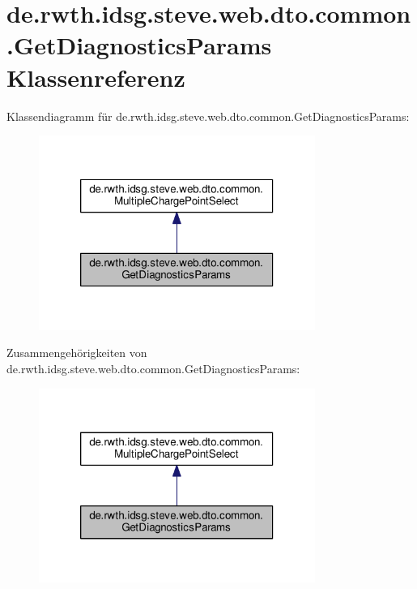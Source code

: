 \hypertarget{classde_1_1rwth_1_1idsg_1_1steve_1_1web_1_1dto_1_1common_1_1_get_diagnostics_params}{\section{de.\-rwth.\-idsg.\-steve.\-web.\-dto.\-common.\-Get\-Diagnostics\-Params Klassenreferenz}
\label{classde_1_1rwth_1_1idsg_1_1steve_1_1web_1_1dto_1_1common_1_1_get_diagnostics_params}
}


Klassendiagramm für de.\-rwth.\-idsg.\-steve.\-web.\-dto.\-common.\-Get\-Diagnostics\-Params\-:\nopagebreak
\begin{figure}[H]
\begin{center}
\leavevmode
\includegraphics[width=256pt]{classde_1_1rwth_1_1idsg_1_1steve_1_1web_1_1dto_1_1common_1_1_get_diagnostics_params__inherit__graph}
\end{center}
\end{figure}


Zusammengehörigkeiten von de.\-rwth.\-idsg.\-steve.\-web.\-dto.\-common.\-Get\-Diagnostics\-Params\-:\nopagebreak
\begin{figure}[H]
\begin{center}
\leavevmode
\includegraphics[width=256pt]{classde_1_1rwth_1_1idsg_1_1steve_1_1web_1_1dto_1_1common_1_1_get_diagnostics_params__coll__graph}
\end{center}
\end{figure}
